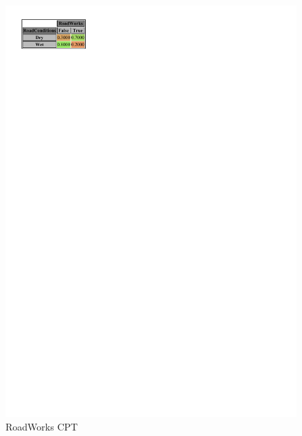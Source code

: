 \documentclass[a4paper,12pt]{article} %
\begin{document}
\begin{figure}[H]
\begin{center}
\begin{minipage}[c]{.35\textwidth}
		\includegraphics[width=.9\linewidth]{../code/roadworks.pdf}	
		\caption*{RoadWorks CPT}
		\label{fig:roadworks}
	\end{minipage}


\end{center}
\end{figure}
\end{document}
